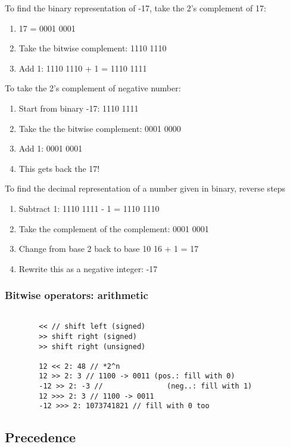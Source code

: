 \documentclass{scrartcl}
\begin{document}
    To find the binary representation of -17, take the 2's complement of 17:
    \begin{enumerate}
        \item 17 = 0001 0001
        \item Take the bitwise complement: 1110 1110
        \item Add 1: 1110 1110 + 1 = 1110 1111
    \end{enumerate}

    To take the 2's complement of negative number:
    \begin{enumerate}
        \item Start from binary -17: 1110 1111
        \item     Take the the bitwise complement: 0001 0000
        \item     Add 1: 0001 0001
        \item     This gets back the 17!
    \end{enumerate}

    To find the decimal representation of a number given in binary, reverse steps
   \begin{enumerate}
       \item  Subtract 1: 1110 1111 - 1 = 1110 1110
       \item     Take the complement of the complement: 0001 0001
       \item     Change from base 2 back to base 10 16 + 1 = 17
       \item     Rewrite this as a negative integer: -17
   \end{enumerate}

\subsubsection{Bitwise operators: arithmetic}
    \begin{lstlisting}

        << // shift left (signed)
        >> shift right (signed)
        >> shift right (unsigned)

        12 << 2: 48 // *2^n
        12 >> 2: 3 // 1100 -> 0011 (pos.: fill with 0)
        -12 >> 2: -3 //               (neg..: fill with 1)
        12 >>> 2: 3 // 1100 -> 0011
        -12 >>> 2: 1073741821 // fill with 0 too
    \end{lstlisting}

\subsection{Precedence}
\end{document}
